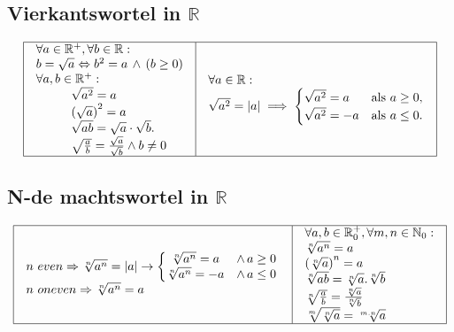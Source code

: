 \documentclass[a5paper]{article}
\begin{document}
\subsection{Vierkantswortel in $\mathbb{R}$}

\[
\begin{array}{|c|c|}
\hline
\begin{array}{l}
\forall a\in\mathbb{R}^+,\forall b\in\mathbb{R}:\\
 b=\sqrt a\Leftrightarrow b^2=a\,\land\,(b\geq0)\\
\forall a,b\in\mathbb{R}^+:\\
\hspace{1cm}\sqrt{a^2}=a\\
\hspace{1cm}\left(\sqrt a\right)^2=a\\
\hspace{1cm}\sqrt{ab} = \sqrt{a} \cdot \sqrt{b}.\\
\hspace{1cm}\sqrt{\frac{a}{b}} = \frac{\sqrt{a}}{\sqrt{b}} \land b \neq 0\\
\end{array} & \begin{array}{l}
\forall a\in\mathbb{R}:\\
\sqrt{a^2} = \left|a\right| \implies 
\begin{cases} 
    \sqrt{a^2} = a & \text{als } a \geq 0, \\ 
    \sqrt{a^2} = -a & \text{als } a \leq 0.
\end{cases}
\end{array} \\ 
\hline
\end{array}
\]

\subsection{N-de machtswortel in $\mathbb{R}$}
\[
\begin{array}{|c|c|}
\hline
\begin{array}{l}
n\,\,even\Rightarrow\sqrt[n]{a^n}=\left|a\right|\rightarrow\left\{\begin{matrix}\sqrt[n]{a^n}=a&\land\, a\geq0\\\sqrt[n]{a^n}=-a&\land\, a\le0\\\end{matrix}\right.\,\\
n\,\, oneven\Rightarrow\sqrt[n]{a^n}=a
\end{array} & \begin{array}{l}
\forall a,b\in\mathbb{R}_0^+,\forall m,n\in\mathbb{N}_0:\\
\sqrt[n]{a^n}=a\\
\left(\sqrt[n]{a}\right)^n=a\\
\sqrt[n]{ab}=\sqrt[n]{a}.\sqrt[n]{b}\\
\sqrt[n]{\frac{a}{b}}=\frac{\sqrt[n]{a}}{\sqrt[n]{b}}\\
\sqrt[m]{\sqrt[n]{a}}=\sqrt[m.n]{a}
\end{array} \\ 
\hline
\end{array}
\]
\end{document}
